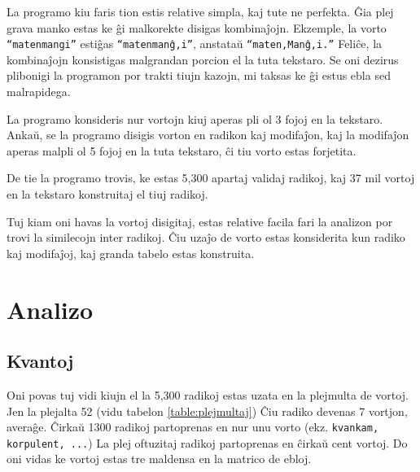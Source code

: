 \documentclass[12pt,twoside]{article}
\begin{document}
La programo kiu faris tion estis relative simpla, kaj tute ne perfekta. Ĝia plej grava manko estas
ke ĝi malkorekte disigas kombinaĵojn. Ekzemple, la vorto \texttt{``matenmangi''} estiĝas \texttt{``matenmanĝ,i''}, anstataŭ
\texttt{``maten,Manĝ,i.''} Feliĉe, la kombinaĵojn konsistigas malgrandan porcion el la tuta tekstaro. Se oni dezirus
plibonigi la programon por trakti tiujn kazojn, mi taksas ke ĝi estus ebla sed malrapidega.

La programo konsideris nur vortojn kiuj aperas pli ol 3 fojoj en la tekstaro. Ankaŭ, se la programo disigis vorton en 
radikon kaj modifaĵon, kaj la modifaĵon aperas malpli ol 5 fojoj en la tuta tekstaro, ĉi tiu vorto estas forjetita.

De tie la programo trovis, ke estas 5,300 apartaj validaj radikoj, kaj 37 mil vortoj en la tekstaro konstruitaj el tiuj radikoj.

Tuj kiam oni havas la vortoj disigitaj, estas relative facila fari la analizon por trovi la similecojn inter radikoj.
Ĉiu uzaĵo de vorto estas konsiderita kun radiko kaj modifaĵoj, kaj granda tabelo estas konstruita.

\section{Analizo}
\subsection{Kvantoj}

Oni povas tuj vidi kiujn el la 5,300 radikoj estas uzata en la plejmulta de vortoj. Jen la plejalta 52 (vidu tabelon \ref{table:plejmultaj})
Ĉiu radiko devenas 7 vortjon, averaĝe. Ĉirkaŭ 1300 radikoj partoprenas en nur unu vorto (ekz. \texttt{kvankam, korpulent, ...})
La plej oftuzitaj radikoj partoprenas en ĉirkaŭ cent vortoj. Do oni vidas ke vortoj estas tre maldensa en la matrico de ebloj.
\end{document}
